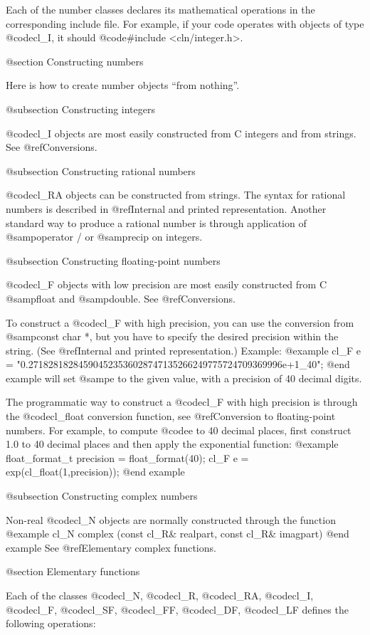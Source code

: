 Each of the number classes declares its mathematical operations in the
corresponding include file. For example, if your code operates with
objects of type @code{cl_I}, it should @code{#include <cln/integer.h>}.


@section Constructing numbers

Here is how to create number objects ``from nothing''.


@subsection Constructing integers

@code{cl_I} objects are most easily constructed from C integers and from
strings. See @ref{Conversions}.


@subsection Constructing rational numbers

@code{cl_RA} objects can be constructed from strings. The syntax
for rational numbers is described in @ref{Internal and printed representation}.
Another standard way to produce a rational number is through application
of @samp{operator /} or @samp{recip} on integers.


@subsection Constructing floating-point numbers

@code{cl_F} objects with low precision are most easily constructed from
C @samp{float} and @samp{double}. See @ref{Conversions}.

To construct a @code{cl_F} with high precision, you can use the conversion
from @samp{const char *}, but you have to specify the desired precision
within the string. (See @ref{Internal and printed representation}.)
Example:
@example
   cl_F e = "0.271828182845904523536028747135266249775724709369996e+1_40";
@end example
will set @samp{e} to the given value, with a precision of 40 decimal digits.

The programmatic way to construct a @code{cl_F} with high precision is
through the @code{cl_float} conversion function, see
@ref{Conversion to floating-point numbers}. For example, to compute
@code{e} to 40 decimal places, first construct 1.0 to 40 decimal places
and then apply the exponential function:
@example
   float_format_t precision = float_format(40);
   cl_F e = exp(cl_float(1,precision));
@end example


@subsection Constructing complex numbers

Non-real @code{cl_N} objects are normally constructed through the function
@example
   cl_N complex (const cl_R& realpart, const cl_R& imagpart)
@end example
See @ref{Elementary complex functions}.


@section Elementary functions

Each of the classes @code{cl_N}, @code{cl_R}, @code{cl_RA}, @code{cl_I},
@code{cl_F}, @code{cl_SF}, @code{cl_FF}, @code{cl_DF}, @code{cl_LF}
defines the following operations:

